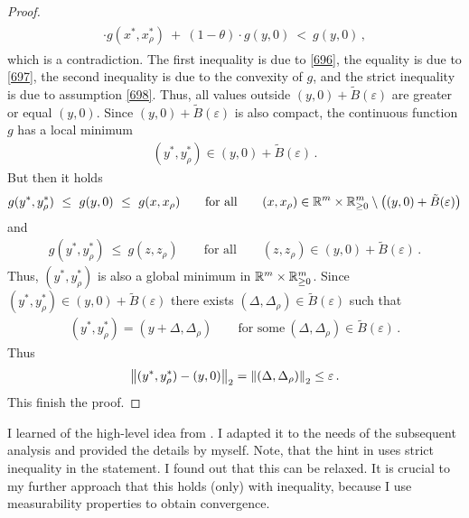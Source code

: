\begin{proof}
\begin{align*}
\begin{split}
    \cdot
      g
  (
x^*,x^*_\rho
  )
  \ 
  +
  \ 
  (
  1
  -
\theta
  )
  \cdot
  g
  (y,0)
  \ 
      <
  \ 
      g(y,0)
  \,    ,
      \end{split}
    \end{align*}
    which is a contradiction.
    The first inequality is due to \eqref{696}, the equality is due to \eqref{697}, the second inequality is due to the convexity of $g$,
    and the strict inequality is due to assumption \eqref{698}.
    Thus, all values outside 
    $(y,0)+\tilde{B}(\varepsilon)$
    are greater or equal $(y,0)$.
    Since 
    $(y,0)+\tilde{B}(\varepsilon)$
    is also compact, the continuous function $g$ has a local minimum
    \begin{gather*}
      (y^*,y^*_\rho)\in
    (y,0)+\tilde{B}(\varepsilon)
    \,.
    \end{gather*}
    But then it holds
    \begin{gather*}
      g
      (y^*,y^*_\rho)
      \ 
      \le
      \ 
      g(y,0)
      \ 
      \le
      \ 
      g
      (x,x_\rho)
      \qquad
      \text{for all}
      \qquad 
      (x,x_\rho)
      \in
\R^m\times\R^m_{\ge 0}\setminus 
\left(
  (y,0)
  +
    \tilde{B}(\varepsilon)
\right)
    \end{gather*}
    and
    \begin{gather*}
      g
      (y^*,y^*_\rho)
      \ 
      \le
      \ 
      g
      (z,z_\rho)
      \qquad
      \text{for all}
      \qquad 
      (z,z_\rho)
      \in
  (y,0)
  +
    \tilde{B}(\varepsilon)
    \,.
    \end{gather*}
    Thus,
    $
      (y^*,y^*_\rho)
    $
    is also a global minimum in
    $
\mathbb{R}^m\times\mathbb{R}^m_{\ge 0}
    $.
Since
    $
      (y^*,y^*_\rho)
      \in
  (y,0)
  +
    \tilde{B}(\varepsilon)
    $
    there exists
    $
    (\Delta,\Delta_\rho)\in
    \tilde{B}(\varepsilon)
    $
    such that 
    \begin{gather*}
      (y^*,y^*_\rho)
      =
      (y+\Delta,\Delta_\rho)
      \qquad
      \text{for some}\ 
      (\Delta,\Delta_\rho)
      \in
      \tilde{B}(\varepsilon)
      \,.
    \end{gather*}
  Thus
  \begin{gather*}
    \left\lVert
      (y^*,y^*_\rho)
      -
      (y,0)
    \right\rVert_2
    =
    \left\lVert
      (\Delta,\Delta_\rho)
    \right\rVert_2
    \le \varepsilon
    \,.
  \end{gather*}
  This finish the proof.
\end{proof}
\begin{remark}
  I learned of the high-level idea from \cite[page 22]{Wang2019}.
  I adapted it to the needs of the subsequent analysis and provided the details by myself.
  Note, that the hint in \cite[page 22]{Wang2019}
  uses strict inequality in the statement.
  I found out that this can be relaxed.
  It is crucial to my further approach that this holds (only) with inequality, because I use measurability properties to obtain convergence.
\end{remark}
